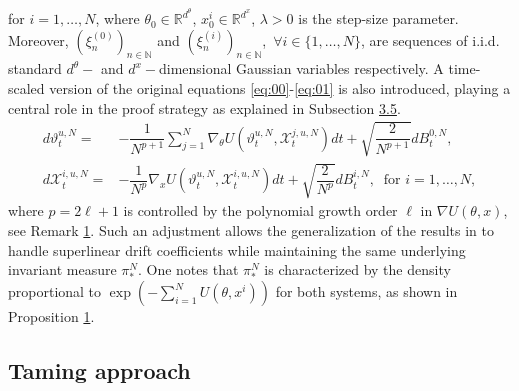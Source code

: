 \documentclass[a4paper, 10pt]{article}
\theoremstyle{plain}%
\begin{document}
for $i=1,\ldots,N$, where ${\theta}_0\in\mathbb{R}^{d^{\theta}}$, $x^i_0\in\mathbb{R}^{d^x}$, $\lambda>0$ is the step-size parameter. Moreover, $(\xi^{(0)}_n)_{n\in\mathbb{N}}$ and $(\xi^{(i)}_n)_{n\in\mathbb{N}}$,\ $\forall i\in\{1,\ldots,N\}$, are sequences of i.i.d. standard $d^\theta-$ and $d^x-$dimensional Gaussian variables respectively. A time-scaled version of the original equations \eqref{eq:00}-\eqref{eq:01} is also introduced, playing a central role in the proof strategy as explained in Subsection \hyperref[summary]{3.5}.
\begin{align}
d\vartheta_t^{u,N}=&-\dfrac{1}{N^{p+1}}\sum_{j=1}^N\nabla_{\theta}U(\vartheta_t^{u,N},\mathcal{X}^{j,u,N}_t)dt+\sqrt{\dfrac{2}{N^{p+1}}}dB_t^{0,N},\label{eq:02}\\d\mathcal{X}_t^{i,u,N}=&-\dfrac{1}{N^p}\nabla_{x}U(\vartheta_t^{u,N},\mathcal{X}^{i,u,N}_t)dt+\sqrt{\dfrac{2}{N^p}}dB_t^{i,N},\ \label{eq:03}\text{ for } i=1,\ldots,N,
\end{align}
where $p=2\ell+1$ is controlled by the polynomial growth order $\ell$ in $\nabla U(\theta,x)$, see Remark \hyperlink{Remark1}{1}. Such an adjustment allows the generalization of the results in \cite{Ipla} to handle superlinear drift coefficients while maintaining the same underlying invariant measure $\pi_*^N$. One notes that $\pi_*^N$ is characterized by the density proportional to $\exp(-\sum_{i=1}^NU(\theta,x^i))$ for both systems, as shown in Proposition \hyperlink{Prop1}{1}.
\subsection{Taming approach}\label{sec3}
\end{document}
